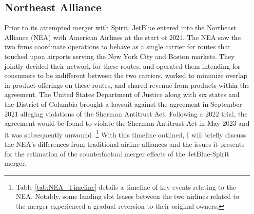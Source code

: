 \documentclass{article}
\begin{document}

    	
	\subsection{Northeast Alliance}
	\label{sec:Setting_NEA}
	
	Prior to its attempted merger with Spirit, JetBlue entered into the Northeast Alliance (NEA) with American Airlines at the start of 2021. The NEA saw the two firms coordinate operations to behave as a single carrier for routes that touched upon airports serving the New York City and Boston markets. They jointly decided their network for these routes, and operated them intending for consumers to be indifferent between the two carriers, worked to minimize overlap in product offerings on these routes, and shared revenue from products within the agreement. The United States Department of Justice along with six states and the District of Columbia brought a lawsuit against the agreement in September 2021 alleging violations of the Sherman Antitrust Act. Following a 2022 trial, the agreement would be found to violate the Sherman Antitrust Act in May 2023 and it was subsequently unwound \citep{rennison_jetblue-american_2023, rains_what_2023}.\footnote{Table \ref{tab:NEA_Timeline} details a timeline of key events relating to the NEA. Notably, some landing slot leases between the two airlines related to the merger experienced a gradual reversion to their original owners.} With this timeline outlined, I will briefly discuss the NEA's differences from traditional airline alliances and the issues it presents for the estimation of the counterfactual merger effects of the JetBlue-Spirit merger. 
\end{document}
